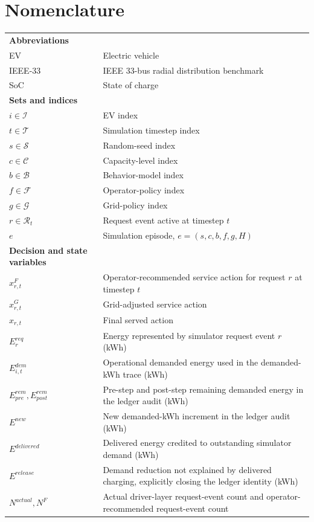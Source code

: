 \documentclass[12pt]{article}
\begin{document}
\section*{Nomenclature}
\begin{longtable}{p{}p{}}
\textbf{Abbreviations} & \\
EV & Electric vehicle \\
IEEE-33 & IEEE 33-bus radial distribution benchmark \\
SoC & State of charge \\
\textbf{Sets and indices} & \\
$i \in \mathcal{I}$ & EV index \\
$t \in \mathcal{T}$ & Simulation timestep index \\
$s \in \mathcal{S}$ & Random-seed index \\
$c \in \mathcal{C}$ & Capacity-level index \\
$b \in \mathcal{B}$ & Behavior-model index \\
$f \in \mathcal{F}$ & Operator-policy index \\
$g \in \mathcal{G}$ & Grid-policy index \\
$r \in \mathcal{R}_t$ & Request event active at timestep $t$ \\
$e$ & Simulation episode, $e=(s,c,b,f,g,H)$ \\
\textbf{Decision and state variables} & \\
$x^F_{r,t}$ & Operator-recommended service action for request $r$ at timestep $t$ \\
$x^G_{r,t}$ & Grid-adjusted service action \\
$x_{r,t}$ & Final served action \\
$E^{req}_r$ & Energy represented by simulator request event $r$ (kWh) \\
$E^{dem}_{i,t}$ & Operational demanded energy used in the demanded-kWh trace (kWh) \\
$E^{rem}_{pre},E^{rem}_{post}$ & Pre-step and post-step remaining demanded energy in the ledger audit (kWh) \\
$E^{new}$ & New demanded-kWh increment in the ledger audit (kWh) \\
$E^{delivered}$ & Delivered energy credited to outstanding simulator demand (kWh) \\
$E^{release}$ & Demand reduction not explained by delivered charging, explicitly closing the ledger identity (kWh) \\
$N^{actual},N^F$ & Actual driver-layer request-event count and operator-recommended request-event count \\

\end{longtable}
\end{document}
